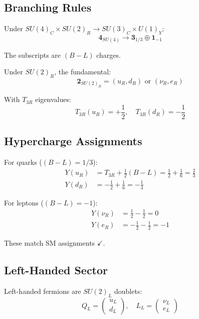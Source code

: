 \documentclass[11pt,a4paper]{article}
\begin{document}
\subsection{Branching Rules}
\label{app:branching}

Under $SU(4)_C \times SU(2)_R \to SU(3)_C \times U(1)_Y$:
\begin{equation}
\label{eq:fund-4-branch}
\mathbf{4}_{SU(4)} \to \mathbf{3}_{1/3} \oplus \mathbf{1}_{-1}
\end{equation}

The subscripts are $(B-L)$ charges.

Under $SU(2)_R$, the fundamental:
\begin{equation}
\label{eq:su2r-branch}
\mathbf{2}_{SU(2)_R} = (u_R, d_R) \text{ or } (\nu_R, e_R)
\end{equation}

With $T_{3R}$ eigenvalues:
\begin{equation}
\label{eq:t3r-eigenvalues}
T_{3R}(u_R) = +\frac{1}{2}, \quad T_{3R}(d_R) = -\frac{1}{2}
\end{equation}

\subsection{Hypercharge Assignments}
\label{app:y-assignments}

For quarks ($(B-L) = 1/3$):
\begin{align}
\label{eq:y-ur}
Y(u_R) &= T_{3R} + \frac{1}{2}(B-L) = \frac{1}{2} + \frac{1}{6} = \frac{2}{3} \\
\label{eq:y-dr}
Y(d_R) &= -\frac{1}{2} + \frac{1}{6} = -\frac{1}{3}
\end{align}

For leptons ($(B-L) = -1$):
\begin{align}
\label{eq:y-nur}
Y(\nu_R) &= \frac{1}{2} - \frac{1}{2} = 0 \\
\label{eq:y-er}
Y(e_R) &= -\frac{1}{2} - \frac{1}{2} = -1
\end{align}

These match SM assignments $\checkmark$.

\subsection{Left-Handed Sector}
\label{app:left-sector}

Left-handed fermions are $SU(2)_L$ doublets:
\begin{equation}
\label{eq:left-doublet}
Q_L = \begin{pmatrix} u_L \\ d_L \end{pmatrix}, \quad L_L = \begin{pmatrix} \nu_L \\ e_L \end{pmatrix}
\end{equation}
\end{document}
